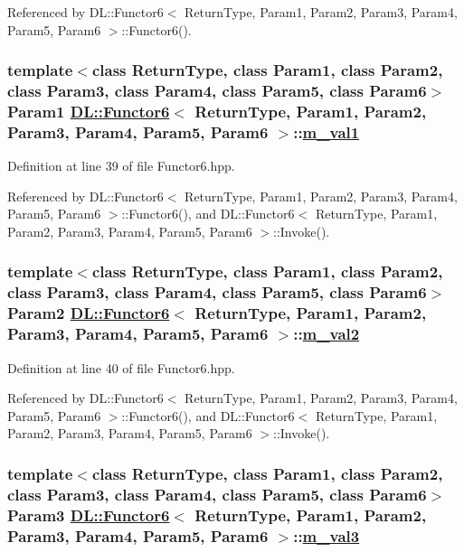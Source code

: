 Referenced by DL::Functor6$<$ Return\-Type, Param1, Param2, Param3, Param4, Param5, Param6 $>$::Functor6().\hypertarget{classDL_1_1Functor6_r1}{
\subsubsection[m\_\-val1]{\setlength{\rightskip}{0pt plus 5cm}template$<$class Return\-Type, class Param1, class Param2, class Param3, class Param4, class Param5, class Param6$>$ Param1 \hyperlink{classDL_1_1Functor6}{DL::Functor6}$<$ Return\-Type, Param1, Param2, Param3, Param4, Param5, Param6 $>$::\hyperlink{classDL_1_1Functor6_r1}{m\_\-val1}}}
\label{classDL_1_1Functor6_r1}




Definition at line 39 of file Functor6.hpp.

Referenced by DL::Functor6$<$ Return\-Type, Param1, Param2, Param3, Param4, Param5, Param6 $>$::Functor6(), and DL::Functor6$<$ Return\-Type, Param1, Param2, Param3, Param4, Param5, Param6 $>$::Invoke().\hypertarget{classDL_1_1Functor6_r2}{
\subsubsection[m\_\-val2]{\setlength{\rightskip}{0pt plus 5cm}template$<$class Return\-Type, class Param1, class Param2, class Param3, class Param4, class Param5, class Param6$>$ Param2 \hyperlink{classDL_1_1Functor6}{DL::Functor6}$<$ Return\-Type, Param1, Param2, Param3, Param4, Param5, Param6 $>$::\hyperlink{classDL_1_1Functor6_r2}{m\_\-val2}}}
\label{classDL_1_1Functor6_r2}




Definition at line 40 of file Functor6.hpp.

Referenced by DL::Functor6$<$ Return\-Type, Param1, Param2, Param3, Param4, Param5, Param6 $>$::Functor6(), and DL::Functor6$<$ Return\-Type, Param1, Param2, Param3, Param4, Param5, Param6 $>$::Invoke().\hypertarget{classDL_1_1Functor6_r3}{
\subsubsection[m\_\-val3]{\setlength{\rightskip}{0pt plus 5cm}template$<$class Return\-Type, class Param1, class Param2, class Param3, class Param4, class Param5, class Param6$>$ Param3 \hyperlink{classDL_1_1Functor6}{DL::Functor6}$<$ Return\-Type, Param1, Param2, Param3, Param4, Param5, Param6 $>$::\hyperlink{classDL_1_1Functor6_r3}{m\_\-val3}}}
\label{classDL_1_1Functor6_r3}




